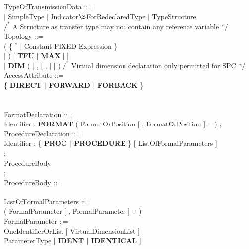 TypeOfTransmissionData ::=\\
 $\mid$ SimpleType $\mid$ Indicator$\S $ForRedeclaredType $\mid$ TypeStructure\\
\x $/^*$ A Structure as transfer type may not contain any reference variable $*/$\\

Topology ::=\\
 ( \{ $^*$ $\mid$ Constant-FIXED-Expression \}\\
\x \x [ , \{ $^*$ $\mid$ Constant-FIXED-Expression \}\\
\x \x \x [ , \{ $^*$ $\mid$ Constant-FIXED-Expression \} ] ] ) [ {\bf TFU} [ {\bf MAX} ] ]\\
\x $\mid$ {\bf DIM} ( [ , [ , ] ] ) $/^*$ Virtual dimension declaration only permitted for SPC $*/$\\

AccessAttribute ::=\\
\x \{ {\bf DIRECT $\mid$ FORWARD $\mid$ FORBACK} \}\\
\\
\\

FormatDeclaration ::= \\
\x Identifier : {\bf FORMAT} ( FormatOrPosition [ , FormatOrPosition ] $^{...}$ ) ;\\

ProcedureDeclaration ::=\\
\x Identifier : \{ {\bf PROC $\mid$ PROCEDURE} \} [ ListOfFormalParameters ] \\
\x [ ResultAttribute ] [ GlobalAttribute ] ;\\

\x \x ProcedureBody\\

;\\

ProcedureBody ::=\\
 \\

ListOfFormalParameters ::=\\
\x ( FormalParameter [ , FormalParameter ] $^{...}$ )\\
        
FormalParameter ::=\\
\x OneIdentifierOrList [ VirtualDimensionList ]\\
\x \x ParameterType [ {\bf IDENT $\mid$ IDENTICAL} ]\\

